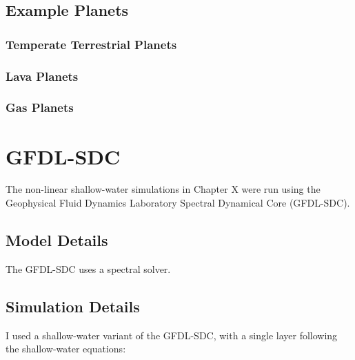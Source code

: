 



\section{Example Planets}

\subsection{Temperate Terrestrial Planets}


\subsection{Lava Planets}


\subsection{Gas Planets}








\chapter{GFDL-SDC}\label{ap:gfdl-sdc}

The non-linear shallow-water simulations in Chapter X were run using the Geophysical Fluid Dynamics Laboratory Spectral Dynamical Core (GFDL-SDC).

\section{Model Details}

The GFDL-SDC uses a spectral solver.

\section{Simulation Details}

I used a shallow-water variant of the GFDL-SDC, with a single layer following the shallow-water equations:

